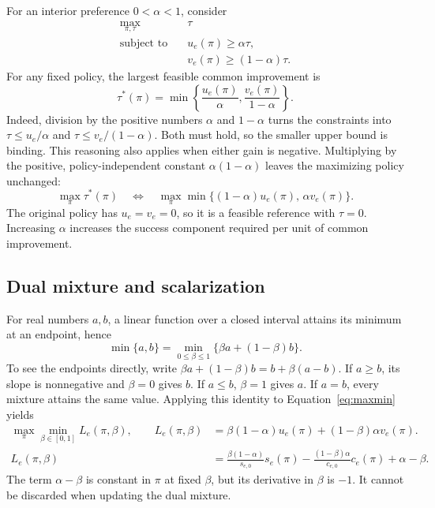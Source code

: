 \documentclass[11pt]{article}
\begin{document}
For an interior preference $0<\alpha<1$, consider
\begin{equation}
 \begin{aligned}
  \max_{\pi,\tau}\quad &\tau\\
  \text{subject to}\quad &u_e(\pi)\geq\alpha\tau,\\
                        &v_e(\pi)\geq(1-\alpha)\tau.
 \end{aligned}\label{eq:constrained}
\end{equation}
For any fixed policy, the largest feasible common improvement is
\begin{equation}
 \tau^*(\pi)=\min\left\{\frac{u_e(\pi)}{\alpha},
                               \frac{v_e(\pi)}{1-\alpha}\right\}.
\end{equation}
Indeed, division by the positive numbers $\alpha$ and $1-\alpha$ turns the constraints into $\tau\leq u_e/\alpha$ and $\tau\leq v_e/(1-\alpha)$. Both must hold, so the smaller upper bound is binding. This reasoning also applies when either gain is negative.
Multiplying by the positive, policy-independent constant $\alpha(1-\alpha)$ leaves the maximizing policy unchanged:
\begin{equation}
 \max_\pi\tau^*(\pi)\quad\Longleftrightarrow\quad
 \max_\pi\min\{(1-\alpha)u_e(\pi),\,\alpha v_e(\pi)\}.
 \label{eq:maxmin}
\end{equation}
The original policy has $u_e=v_e=0$, so it is a feasible reference with $\tau=0$. Increasing $\alpha$ increases the success component required per unit of common improvement.

\subsection{Dual mixture and scalarization}

For real numbers $a,b$, a linear function over a closed interval attains its minimum at an endpoint, hence
\begin{equation}
 \min\{a,b\}=\min_{0\leq\beta\leq1}\{\beta a+(1-\beta)b\}.
\end{equation}
To see the endpoints directly, write $\beta a+(1-\beta)b=b+\beta(a-b)$. If $a\geq b$, its slope is nonnegative and $\beta=0$ gives $b$. If $a\leq b$, $\beta=1$ gives $a$. If $a=b$, every mixture attains the same value.
Applying this identity to Equation~\eqref{eq:maxmin} yields
\begin{align}
 \max_\pi\min_{\beta\in[0,1]}L_e(\pi,\beta),\qquad
 L_e(\pi,\beta)&=\beta(1-\alpha)u_e(\pi)+(1-\beta)\alpha v_e(\pi).\label{eq:dual}\\
 L_e(\pi,\beta)&=\frac{\beta(1-\alpha)}{s_{e,0}}s_e(\pi)
 -\frac{(1-\beta)\alpha}{c_{e,0}}c_e(\pi)
 +\alpha-\beta.\label{eq:dualexpanded}
\end{align}
The term $\alpha-\beta$ is constant in $\pi$ at fixed $\beta$, but its derivative in $\beta$ is $-1$. It cannot be discarded when updating the dual mixture.
\end{document}
